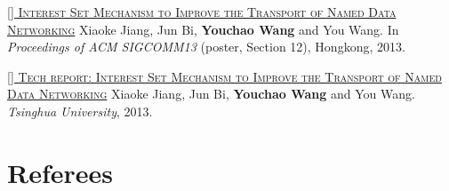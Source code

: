 \documentclass[11pt,a4paper]{moderncv}
\begin{document}
\addtocounter{counter}{1}

\href{https://ndnsim.net/2.3/ndnsim-research-papers.html}{\textsc{[] Interest Set Mechanism to Improve the Transport of Named Data Networking}}
\newline  Xiaoke Jiang, Jun Bi, \textbf{Youchao Wang} and You Wang. In \textit{Proceedings of ACM SIGCOMM13} (poster, Section 12), Hongkong, 2013. 

\addtocounter{counter}{1}

\href{http://netarchlab.tsinghua.edu.cn/~shock/THU-NetArchLab-ICN-TR-ISTSET-20130517.pdf}{\textsc{[] Tech report: Interest Set Mechanism to Improve the Transport of Named Data Networking}}
\newline  Xiaoke Jiang, Jun Bi, \textbf{Youchao Wang} and You Wang.\textit{ Tsinghua University}, 2013. 

\addtocounter{counter}{1}

\vspace*{-0.2cm}



\section{Referees}
\end{document}
